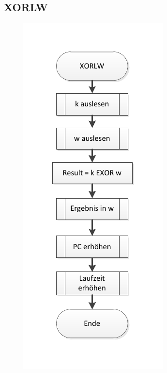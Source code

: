 \newpage
\subsection{XORLW}


\begin{figure}[h]
\centering
\includegraphics[scale=0.7]{Diag/XORLW.pdf}
\end{figure}
